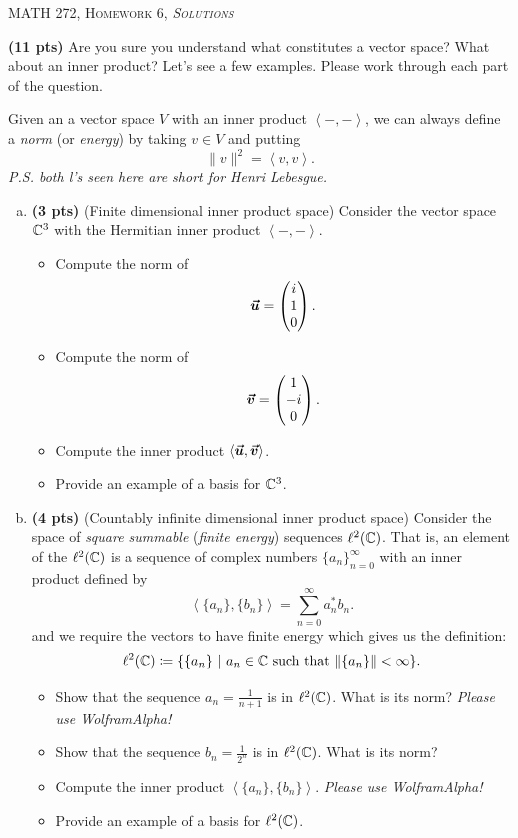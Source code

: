 \documentclass[12pt]{article} %
\newcommand{\innprod}[2]{\left\langle #1, #2\right\rangle}
\begin{document}
\begin{center}
   \textsc{\large MATH 272, Homework 6, \emph{Solutions}}\\
\end{center}
\vspace{.5cm}


\begin{problem} \textbf{(11 pts)} Are you sure you understand what constitutes a vector space? What about an inner product? Let's see a few examples. Please work through each part of the question.

Given an a vector space $V$ with an inner product $\innprod{-}{-}$, we can always define a \emph{norm} (or \emph{energy}) by taking $v\in V$ and putting
\[
\|v\|^2 = \innprod{v}{v}.
\]
\emph{P.S. both l's seen here are short for Henri Lebesgue.}
\begin{enumerate}[(a)]
\item \textbf{(3 pts)} (Finite dimensional inner product space) Consider the vector space $\mathbb{C}^3$ with the Hermitian inner product $\innprod{-}{-}$.
\begin{itemize}
\item Compute the norm of 	
\[
		\boldsymbol{\vec{u}} = \begin{pmatrix} i \\ 1 \\ 0 \end{pmatrix}.
	\]
\item Compute the norm of
\[
\boldsymbol{\vec{v}} = \begin{pmatrix} 1 \\ -i \\ 0 \end{pmatrix}.
\]
\item Compute the inner product $\innprod{\vecu}{\vecv}$.
\item Provide an example of a basis for $\mathbb{C}^3$. 
\end{itemize}

\item \textbf{(4 pts)} (Countably infinite dimensional inner product space) Consider the space of \emph{square summable} (\emph{finite energy}) sequences $\ell^2(\mathbb{C})$. That is, an element of the $\ell^2(\mathbb{C})$ is a sequence of complex numbers $\{a_n\}_{n=0}^\infty$ with an inner product defined by
\[
\innprod{\{a_n\}}{\{b_n\}} = \sum_{n=0}^\infty a_n^* b_n.
\]
and we require the vectors to have finite energy which gives us the definition:
\[
\ell^2(\mathbb{C}) \coloneqq \{ \{a_n\} ~|~ a_n \in \mathbb{C} ~\textrm{such that $\|\{a_n\}\|<\infty$}\}.
\]
\begin{itemize}
\item Show that the sequence $a_n = \frac{1}{n+1}$ is in $\ell^2(\mathbb{C})$. What is its norm? \emph{Please use WolframAlpha!}
\item Show that the sequence $b_n = \frac{1}{2^n}$ is in $\ell^2(\mathbb{C})$. What is its norm? 
\item Compute the inner product $\innprod{\{a_n\}}{\{b_n\}}$. \emph{Please use WolframAlpha!}
\item Provide an example of a basis for $\ell^2(\mathbb{C})$.
\end{itemize}


\end{enumerate}
\end{problem}
\end{document}
